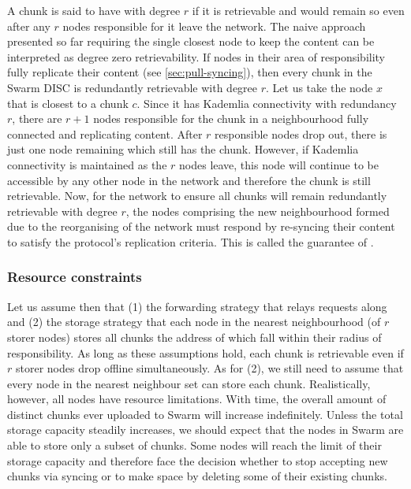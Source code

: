 A chunk is said to have  with degree $r$ if it is retrievable and would remain so even after any $r$ nodes responsible for it leave the network. The naive approach presented so far requiring the single closest node to keep the content can be interpreted as degree zero retrievability. If nodes in their area of responsibility fully replicate their content (see \ref{sec:pull-syncing}), then every chunk in the Swarm DISC is redundantly retrievable with degree $r$. Let us take the node $x$ that is closest to a chunk $c$. Since it has Kademlia connectivity with redundancy $r$, there are $r+1$ nodes responsible for the chunk in a neighbourhood fully connected and replicating content. After $r$ responsible nodes drop out, there is just one node remaining which still has the chunk. However, if Kademlia connectivity is maintained as the $r$ nodes leave, this node will continue to be accessible by any other node in the network and therefore the chunk is still retrievable. Now, for the network to ensure all chunks will remain redundantly retrievable with degree $r$, the nodes comprising the new neighbourhood formed due to the reorganising of the network must respond by re-syncing their content to satisfy the protocol's replication criteria. This is called the guarantee of .

\subsubsection{Resource constraints}

Let us assume then that (1) the forwarding strategy that relays requests along  and (2) the storage strategy that each node in the nearest neighbourhood (of $r$ storer nodes) stores all chunks the address of which fall within their radius of responsibility. As long as these assumptions hold, each chunk is retrievable even if $r$ storer nodes drop offline simultaneously. As for (2), we still need to assume that every node in the nearest neighbour set can store each chunk. Realistically, however, all nodes have resource limitations. With time, the overall amount of distinct chunks ever uploaded to Swarm will increase indefinitely. Unless the total storage capacity steadily increases, we should expect that the nodes in Swarm are able to store only a subset of chunks. Some nodes will reach the limit of their storage capacity and therefore face the decision whether to stop accepting new chunks via syncing or to make space by deleting some of their existing chunks. 

